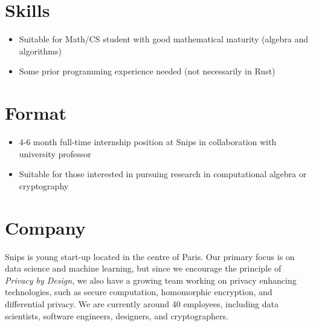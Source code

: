 \documentclass{article}
\begin{document}
\section*{Skills}
\begin{itemize}
\item Suitable for Math/CS student with good mathematical maturity (algebra and algorithms)
\item Some prior programming experience needed (not necessarily in Rust)
\end{itemize}

\section*{Format}
\begin{itemize}
\item 4-6 month full-time internship position at Snips in collaboration with university professor
\item Suitable for those interested in pursuing research in computational algebra or cryptography
\end{itemize}

\section*{Company}
Snips is young start-up located in the centre of Paris. Our primary focus is on data science and machine learning, but since we encourage the principle of \emph{Privacy by Design}, we also have a growing team working on privacy enhancing technologies, such as secure computation, homomorphic encryption, and differential privacy. We are currently around 40 employees, including data scientists, software engineers, designers, and cryptographers.
\end{document}
